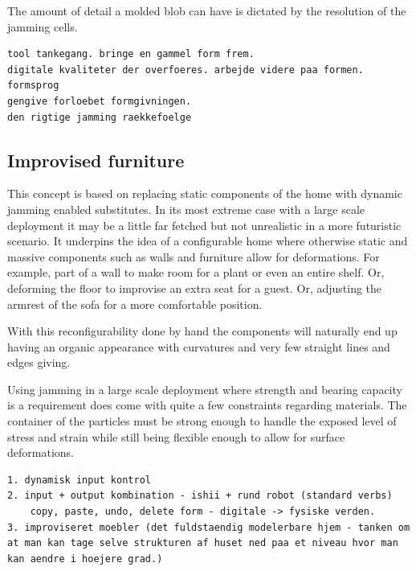 The amount of detail a molded blob can have is dictated by the resolution of the jamming cells.
\blank
{}
\begin{verbatim}
tool tankegang. bringe en gammel form frem.
digitale kvaliteter der overfoeres. arbejde videre paa formen. formsprog
gengive forloebet formgivningen.
den rigtige jamming raekkefoelge
\end{verbatim}

\subsection{Improvised furniture}
\label{ch:jamming:concepts:improvised_furniture}

This concept is based on replacing static components of the home with dynamic jamming enabled substitutes.
In its most extreme case with a large scale deployment it may be a little far fetched but not unrealistic in a more futuristic scenario.
It underpins the idea of a configurable home where otherwise static and massive components such as walls and furniture allow for deformations.
For example,  part of a wall to make room for a plant or even an entire shelf.
Or, deforming the floor to improvise an extra seat for a guest.
Or, adjusting the armrest of the sofa for a more comfortable position.

With this reconfigurability done by hand the components will naturally end up having an organic appearance with curvatures and very few straight lines and edges giving.

Using jamming in a large scale deployment where strength and bearing capacity is a requirement does come with quite a few constraints regarding materials.
The container of the particles must be strong enough to handle the exposed level of stress and strain while still being flexible enough to allow for surface deformations.

\begin{verbatim}
1. dynamisk input kontrol
2. input + output kombination - ishii + rund robot (standard verbs)
	copy, paste, undo, delete form - digitale -> fysiske verden.
3. improviseret moebler (det fuldstaendig modelerbare hjem - tanken om at man kan tage selve strukturen af huset ned paa et niveau hvor man kan aendre i hoejere grad.)

\end{verbatim}


